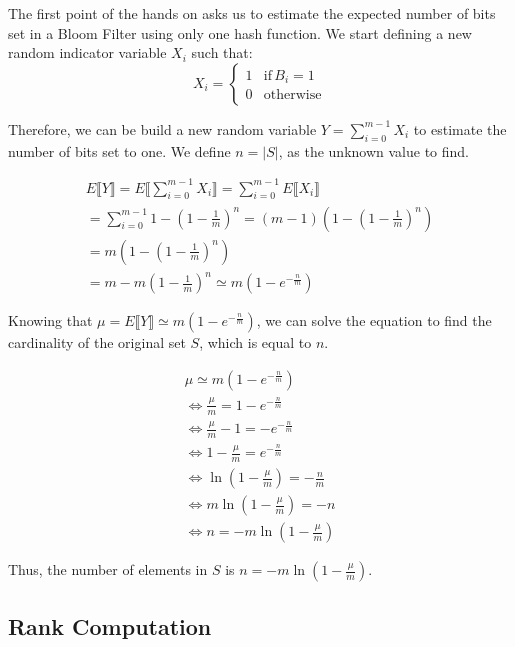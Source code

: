 \documentclass{article}
\begin{document}
The first point of the hands on asks us to estimate the expected number of bits set in a Bloom Filter using only one hash function.
We start defining a new random indicator variable $X_i$ such that:
\begin{equation}
    X_i = \begin{cases}
        1 & \textrm{if} \, B_i = 1 \\
        0 & \textrm{otherwise}
    \end{cases}
\end{equation}

\noindent Therefore, we can be build a new random variable $Y = \sum_{i = 0}^{m - 1}X_i$ to estimate the number of bits set to one. We define $n = |S|$, as the unknown value to find. 

\begin{align*}
    E \llbracket Y \rrbracket = E \bigg\llbracket  \sum_{i = 0}^{m - 1}X_i \bigg\rrbracket = \sum_{i = 0}^{m - 1} E \llbracket X_i \rrbracket \\
    = \sum_{i = 0}^{m - 1} 1 - (1 - \frac{1}{m})^n = (m - 1)(1 - (1 - \frac{1}{m})^n) \\
    = m(1 - (1 - \frac{1}{m})^n) \\
    = m - m(1 - \frac{1}{m})^n \simeq m (1 - e^{-\frac{n}{m}})
\end{align*}

\noindent Knowing that $\mu = E \llbracket Y \rrbracket \simeq m (1 - e^{-\frac{n}{m}})$, we can solve the equation to find the cardinality of the original set $S$, which is equal to $n$.

\begin{align*}
    \mu \simeq m (1 - e^{-\frac{n}{m}}) \\
    \iff \frac{\mu}{m} = 1 - e^{-\frac{n}{m}} \\
    \iff \frac{\mu}{m} - 1 = - e^{-\frac{n}{m}} \\
    \iff 1 - \frac{\mu}{m} = e^{-\frac{n}{m}} \\
    \iff \ln (1 - \frac{\mu}{m}) = -\frac{n}{m} \\
    \iff m \ln (1 - \frac{\mu}{m}) = - n \\
    \iff n = -m \ln (1 - \frac{\mu}{m})
\end{align*}

\noindent Thus, the number of elements in $S$ is $n =  -m \ln (1 - \frac{\mu}{m})$.

\subsection{Rank Computation}
\end{document}
